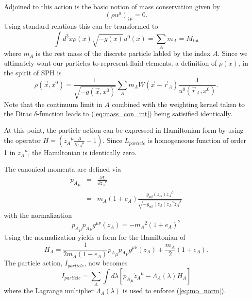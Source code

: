 Adjoined to this action is the basic notion of mass conservation given by
\begin{equation}\label{eq:mass_con}
\left( \rho u^{\mu} \right)_{;\mu} = 0.
\end{equation}
Using standard relations this can be transformed to
\begin{equation}\label{eq:mass_con_int}
\int \! d^3x \rho(x) \sqrt{-g(x)} u^{0}(x) = \sum_{A} m_{A} = M_{tot}
\end{equation}
where $m_A$ is the rest mass of the discrete particle labled by the index $A$.  Since we
ultimately want our particles to represent fluid elements, a definition of $\rho(x)$, in the
spirit of SPH is
\begin{equation}\label{eq:smoothed_rho}
\rho({\vec x}, x^{0}) = \frac{1}{\sqrt{-g({\vec x},x^{0})}} \sum_{A} m_A W(\vec x - \vec r_A)
                        \frac{1}{u^{0}(\vec r_A, x^0)}.
\end{equation}
Note that the continuum limit in $A$ combined with the weighting kernel taken to the Dirac
$\delta$-function leads to (\ref{eq:mass_con_int}) being satisified identically.

At this point, the particle action can be expressed in Hamiltonian form by using the operator
$H = \left( {\dot z_A}^{\mu} \frac{\partial}{\partial {\dot z_A}^{\mu}} - 1 \right)$.  Since
$L_{particle}$ is homogeneous function of order 1 in ${\dot z_A}^{\mu}$, the Hamiltonian is
identically zero.

The canonical momenta are defined via
\begin{eqnarray}\label{eq:can_mo}
{p_A}_{\mu} & = & \frac{\partial L}{\partial {\dot z_A}^{\mu}} \nonumber \\
            & = &  m_A(1+e_A) \frac{ g_{\mu\beta}(z_A) {\dot z_A}^{\beta} }{ \sqrt{-g_{\alpha\beta}(z_A) {\dot z_A}^{\alpha} {\dot z_A}^{\beta}} }
\end{eqnarray}
with the normalization
\begin{equation}\label{eq:mo_norm}
{p_A}_{\mu} {p_A}_{\nu} g^{\mu \nu}(z_A) = -{m_A}^2 (1 + e_A)^2
\end{equation}
Using the normalization yields a form for the Hamiltonian of
\begin{equation}\label{eq:Ham}
H_A = \frac{1}{2 m_A (1 + e_A)} {p_A}_{\mu}{p_A}_{\nu}g^{\mu\nu}(z_A) + \frac{m_A}{2} ( 1 + e_A).
\end{equation}
The particle action, $I_{particle}$, now becomes
\begin{equation}\label{eq:I_part_Ham}
I_{particle} = \sum_A \int \! d\lambda \left[ {p_A}_{\mu} {\dot z_A}^{\mu} - \Lambda_A(\lambda) H_A \right]
\end{equation}
where the Lagrange multiplier $\Lambda_A(\lambda)$ is used to enforce (\ref{eq:mo_norm}).

